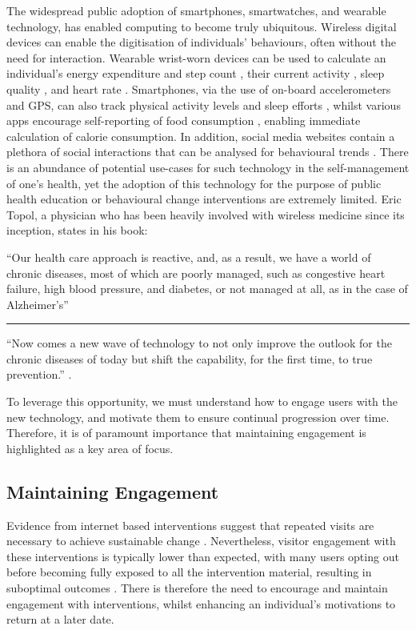 The widespread public adoption of smartphones, smartwatches, and wearable technology, has enabled computing to become truly ubiquitous. Wireless digital devices can enable the digitisation of individuals’ behaviours, often without the need for interaction. Wearable wrist-worn devices can be used to calculate an individual’s energy expenditure and step count \cite{Pande2013}, their current activity \cite{Cleland2013}, sleep quality \cite{Noor2013}, and heart rate \cite{Parak2014}. Smartphones, via the use of on-board accelerometers and GPS, can also track physical activity levels \cite{Ozdalga2012} and sleep efforts \cite{Min2014}, whilst various apps encourage self-reporting of food consumption \cite{Ozdalga2012}, enabling immediate calculation of calorie consumption. In addition, social media websites contain a plethora of social interactions that can be analysed for behavioural trends \cite{Ruths2014}. There is an abundance of potential use-cases for such technology in the self-management of one’s health, yet the adoption of this technology for the purpose of public health education or behavioural change interventions are extremely limited. Eric Topol, a physician who has been heavily involved with wireless medicine since its inception, states in his book:
\begin{displayquote}
``Our health care approach is reactive, and, as a result, we have a world of chronic diseases, most of which are poorly managed, such as congestive heart failure, high blood pressure, and diabetes, or not managed at all, as in the case of Alzheimer’s''
\begin{center}
	\rule{1cm}{0.4pt}
\end{center}
``Now comes a new wave of technology to not only improve the outlook for the chronic diseases of today but shift the capability, for the first time, to true prevention.'' \cite{Topol2012}.
\end{displayquote}

To leverage this opportunity, we must understand how to engage users with the new technology, and motivate them to ensure continual progression over time. Therefore, it is of paramount importance that maintaining engagement is highlighted as a key area of focus.

\subsection{Maintaining Engagement}
Evidence from internet based interventions suggest that repeated visits are necessary to achieve sustainable change \cite{Brouwer2011a}. Nevertheless, visitor engagement with these interventions is typically lower than expected, with many users opting out before becoming fully exposed to all the intervention material, resulting in suboptimal outcomes \cite{Brouwer2011a}. There is therefore the need to encourage and maintain engagement with interventions, whilst enhancing an individual’s motivations to return at a later date.

